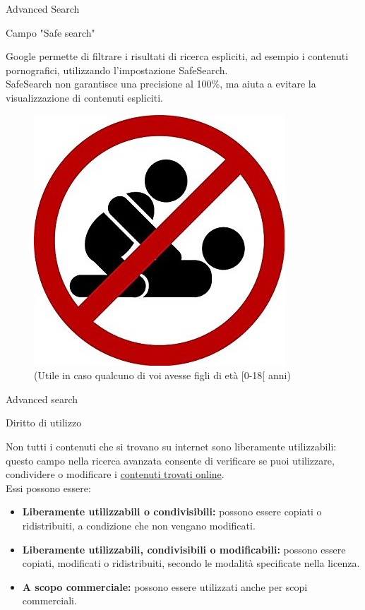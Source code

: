 \documentclass{beamer}
\begin{document}
\begin{frame}{Advanced Search}
\begin{block}{\begin{center}Campo "Safe search"\end{center}}
Google permette di filtrare i risultati di ricerca espliciti, ad esempio i contenuti pornografici, utilizzando l'impostazione SafeSearch.\\ SafeSearch non garantisce una precisione al 100\%, ma aiuta a evitare la visualizzazione di contenuti espliciti.
\end{block}
\begin{figure}[h!]
\includegraphics[width=0.33\linewidth]{immagini/18+.jpg}
\caption {(Utile in caso qualcuno di voi avesse figli di età [0-18[ anni)}
\end{figure}
\end{frame}
\begin{frame}{Advanced search}
\footnotesize
\begin{block}{\begin{center}Diritto di utilizzo\end{center}}
Non tutti i contenuti che si trovano su internet sono liberamente utilizzabili: questo campo nella ricerca avanzata consente di verificare se puoi utilizzare, condividere o modificare i \underline{contenuti trovati online}.\\ Essi possono essere:
\begin{itemize}
\item \textbf{Liberamente utilizzabili o condivisibili:} possono essere copiati o ridistribuiti, a condizione che non vengano modificati.
\item \textbf{Liberamente utilizzabili, condivisibili o modificabili:} possono essere copiati, modificati o ridistribuiti, secondo le modalità specificate nella licenza.
\item \textbf{A scopo commerciale:} possono essere utilizzati anche per scopi commerciali.
\end{itemize}
\end{block}
\end{frame}
\end{document}
